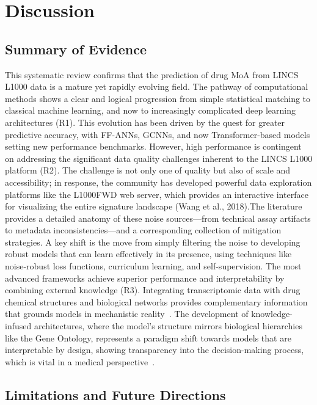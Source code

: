 \documentclass[twocolumn]{article}
\begin{document}
\section{Discussion}
\subsection{Summary of Evidence}

    This systematic review confirms that the prediction of drug MoA from LINCS L1000 data is a mature yet rapidly evolving field. The pathway of computational methods shows a clear and logical progression from simple statistical matching to classical machine learning, and now to increasingly complicated deep learning architectures (R1). This evolution has been driven by the quest for greater predictive accuracy, with FF-ANNs, GCNNs, and now Transformer-based models setting new performance benchmarks\cite{mcdermott2019deep}.
    However, high performance is contingent on addressing the significant data quality challenges inherent to the LINCS L1000 platform (R2). The challenge is not only one of quality but also of scale and accessibility; in response, the community has developed powerful data exploration platforms like the L1000FWD web server, which provides an interactive interface for visualizing the entire signature landscape (Wang et al., 2018)\cite{wang2018l1000fwd}.The literature provides a detailed anatomy of these noise sources—from technical assay artifacts to metadata inconsistencies—and a corresponding collection of mitigation strategies\cite{qiu2020bayesian}. A key shift is the move from simply filtering the noise to developing robust models that can learn effectively in its presence, using techniques like noise-robust loss functions, curriculum learning, and self-supervision.
    The most advanced frameworks achieve superior performance and interpretability by combining external knowledge (R3). Integrating transcriptomic data with drug chemical structures and biological networks provides complementary information that grounds models in mechanistic reality~\cite{wang2016drug}. The development of knowledge-infused architectures, where the model's structure mirrors biological hierarchies like the Gene Ontology, represents a paradigm shift towards models that are interpretable by design, showing transparency into the decision-making process, which is vital in a medical perspective~\cite{samal2022opportunities}.

\subsection{Limitations and Future Directions}
\end{document}

